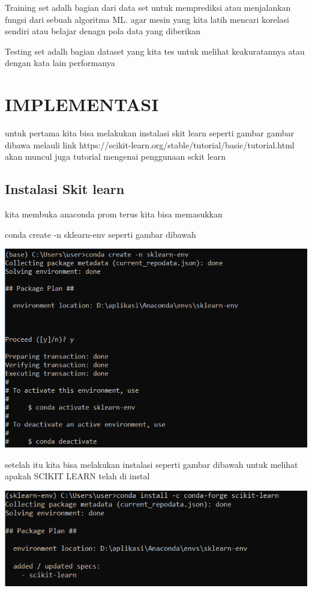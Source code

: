 \documentclass{homework}
\begin{document}
Training set adalh bagian dari data set untuk memprediksi atau menjalankan fungsi dari sebuah algoritma ML. agar mesin yang kita latih mencari korelasi sendiri atau belajar denagn pola data yang diberikan

Testing set adalh bagian dataset yang kita tes untuk melihat keakuratannya atau dengan kata lain performanya



\section{IMPLEMENTASI}
untuk pertama kita bisa melakukan instalasi skit learn seperti gambar gambar dibawa melauli link
https://scikit-learn.org/stable/tutorial/basic/tutorial.html akan muncul juga tutorial mengenai penggunaan sckit learn 
\subsection{Instalasi Skit learn}
kita membuka anaconda prom terus kita bisa memasukkan 

\text conda create -n sklearn-env seperti gambar dibawah
\begin{center}
    \includegraphics[width=.7\textwidth]{figures/1184100/Instal1.PNG}
\end{center}

setelah itu kita bisa melakukan instalasi  seperti gambar dibawah untuk melihat apakah SCIKIT LEARN telah di instal
\begin{center}
    \includegraphics[width=.8\textwidth]{figures/1184100/instal2.PNG}
\end{center}
\end{document}

